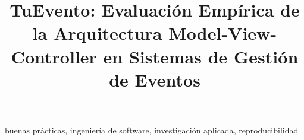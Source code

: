 \documentclass[conference]{IEEEtran}
\begin{document}
\title{TuEvento: Evaluación Empírica de la Arquitectura Model-View-Controller en Sistemas de Gestión de Eventos}

\author{
}

\maketitle

\begin{abstract}

\end{abstract}

\begin{IEEEkeywords}
buenas prácticas, ingeniería de software, investigación aplicada, reproducibilidad
\end{IEEEkeywords}










\printbibliography
\end{document}
